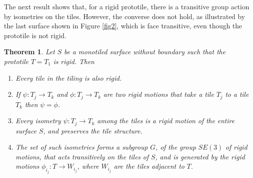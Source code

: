 \documentclass[11pt]{amsart}
\newtheorem{theorem}{Theorem}
\theoremstyle{remark}
\begin{document}
The next result shows that, for a rigid prototile, there is a transitive group action by isometries on the tiles.
However,  the converse does not hold, as illustrated by the last surface shown in Figure \ref{fig2}, which is face transitive, even though the prototile is not rigid.
 \begin{theorem} \label{rigiditythm}
 Let $S$ be a monotiled surface without boundary such that the prototile $T=T_1$ is rigid.
 Then 
 \begin{enumerate}
\item Every tile in the tiling is also rigid.
 \item \label{item1} If $\psi: T_j \to T_k$ and $\phi: T_j \to T_k$ are two rigid motions that take a tile $T_j$ to
 a tile $T_k$ then $\psi = \phi$.
 \item \label{item2} Every isometry $\psi: T_j \to T_k$ among the tiles is a rigid motion of the entire surface $S$, and
 preserves the tile structure.
 \item The set of such isometries forms a subgroup $G$, of the group $SE(3)$ of rigid motions, that acts transitively
 on the tiles of $S$, and is generated by the rigid motions $\phi_{i_j}: T \to W_{i_j}$, where $W_{i_j}$ are the tiles \emph{adjacent} to $T$.
 \end{enumerate}
 \end{theorem}
\end{document}
